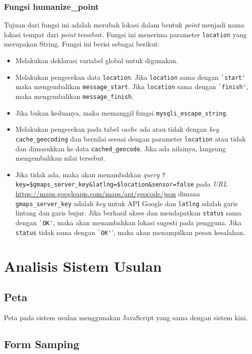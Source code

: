 \subsubsection{Fungsi humanize\_point}
Tujuan dari fungsi ini adalah merubah lokasi dalam bentuk \textit{point} menjadi nama lokasi tempat dari \textit{point} tersebut. Fungsi ini menerima parameter \verb!location! yang merupakan String. Fungsi ini berisi sebagai berikut:
\begin{itemize}
	\item Melakukan deklarasi variabel global untuk digunakan.
	\item Melakukan pengecekan data \verb!location!. Jika \verb!location! sama dengan \verb!`start'! maka mengembalikan \verb!message_start!. Jika \verb!location! sama dengan \verb!`finish'!, maka mengembalikan \verb!message_finish!.
	\item Jika bukan keduanya, maka memanggil fungsi \verb!mysqli_escape_string!.
	\item Melakukan pengecekan pada tabel \textit{cache} ada atau tidak dengan \textit{key} \verb!cache_geocoding! dan bernilai sesuai dengan parameter \verb!location! atau tidak dan dimasukkan ke data \verb!cached_geocode!. Jika ada nilainya, langsung mengembalikan nilai tersebut.
	\item Jika tidak ada, maka akan menambahkan \textit{query} \verb!?key=$gmaps_server_key&latlng=$location&sensor=false! pada \textit{URL} \url{https://maps.googleapis.com/maps/api/geocode/json} dimana \verb!gmaps_server_key! adalah \textit{key} untuk API Google dan \verb!latlng! adalah garis lintang dan garis bujur. Jika berhasil akses dan mendapatkan \verb!status! sama dengan \verb!`OK'!, maka akan menambahkan lokasi sugesti pada pengguna. Jika \verb!status! tidak sama dengan \verb!`OK'!', maka akan menampilkan pesan kesalahan. 
\end{itemize}
\section{Analisis Sistem Usulan}
\label{sec:perubahan}

\subsection{Peta}
Peta pada sistem usulan menggunakan JavaScript yang sama dengan sistem kini.

\subsection{Form Samping}
